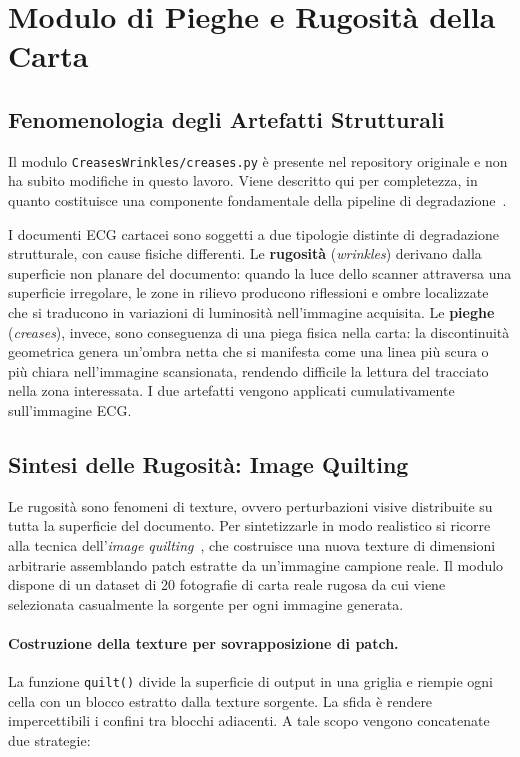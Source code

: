 \section{Modulo di Pieghe e Rugosità della Carta}

\subsection{Fenomenologia degli Artefatti Strutturali}

Il modulo \texttt{CreasesWrinkles/creases.py} è presente nel repository originale e non ha subito modifiche in questo lavoro. Viene descritto qui per completezza, in quanto costituisce una componente fondamentale della pipeline di degradazione~\cite{ecgimagekitpaper}.

I documenti ECG cartacei sono soggetti a due tipologie distinte di degradazione strutturale, con cause fisiche differenti. Le \textbf{rugosità} (\textit{wrinkles}) derivano dalla superficie non planare del documento: quando la luce dello scanner attraversa una superficie irregolare, le zone in rilievo producono riflessioni e ombre localizzate che si traducono in variazioni di luminosità nell'immagine acquisita. Le \textbf{pieghe} (\textit{creases}), invece, sono conseguenza di una piega fisica nella carta: la discontinuità geometrica genera un'ombra netta che si manifesta come una linea più scura o più chiara nell'immagine scansionata, rendendo difficile la lettura del tracciato nella zona interessata. I due artefatti vengono applicati cumulativamente sull'immagine ECG.

\subsection{Sintesi delle Rugosità: Image Quilting}

Le rugosità sono fenomeni di texture, ovvero perturbazioni visive distribuite su tutta la superficie del documento. Per sintetizzarle in modo realistico si ricorre alla tecnica dell'\textit{image quilting}~\cite{efros2023image}, che costruisce una nuova texture di dimensioni arbitrarie assemblando patch estratte da un'immagine campione reale. Il modulo dispone di un dataset di 20 fotografie di carta reale rugosa da cui viene selezionata casualmente la sorgente per ogni immagine generata.

\paragraph{Costruzione della texture per sovrapposizione di patch.} La funzione \texttt{quilt()} divide la superficie di output in una griglia e riempie ogni cella con un blocco estratto dalla texture sorgente. La sfida è rendere impercettibili i confini tra blocchi adiacenti. A tale scopo vengono concatenate due strategie:

